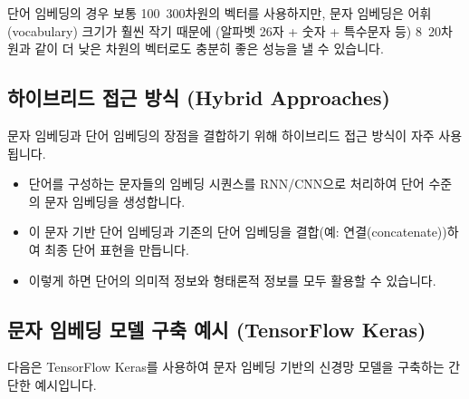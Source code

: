 \documentclass[11pt,a4paper]{article}
\begin{document}
\begin{tipbox}
단어 임베딩의 경우 보통 100~300차원의 벡터를 사용하지만, 문자 임베딩은 어휘(vocabulary) 크기가 훨씬 작기 때문에 (알파벳 26자 + 숫자 + 특수문자 등) 8~20차원과 같이 더 낮은 차원의 벡터로도 충분히 좋은 성능을 낼 수 있습니다.
\end{tipbox}

\subsection{하이브리드 접근 방식 (Hybrid Approaches)}
문자 임베딩과 단어 임베딩의 장점을 결합하기 위해 하이브리드 접근 방식이 자주 사용됩니다.
\begin{itemize}
    \item 단어를 구성하는 문자들의 임베딩 시퀀스를 RNN/CNN으로 처리하여 단어 수준의 문자 임베딩을 생성합니다.
    \item 이 문자 기반 단어 임베딩과 기존의 단어 임베딩을 결합(예: 연결(concatenate))하여 최종 단어 표현을 만듭니다.
    \item 이렇게 하면 단어의 의미적 정보와 형태론적 정보를 모두 활용할 수 있습니다.
\end{itemize}

\subsection{문자 임베딩 모델 구축 예시 (TensorFlow Keras)}
다음은 TensorFlow Keras를 사용하여 문자 임베딩 기반의 신경망 모델을 구축하는 간단한 예시입니다.
\end{document}
